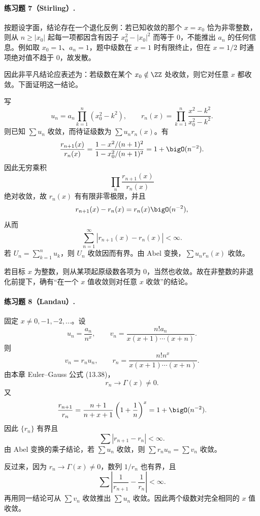 \paragraph{练习题 7（Stirling）.}
\begin{xsolution}
按题设字面，结论存在一个退化反例：若已知收敛的那个 $x=x_0$ 恰为非零整数，则从 $n\geq|x_0|$ 起每一项都因含有因子 $x_0^2-|x_0|^2$ 而等于 $0$，不能推出 $a_n$ 的任何信息。例如取 $x_0=1$、$a_n=1$，题中级数在 $x=1$ 时有限终止，但在 $x=1/2$ 时通项绝对值不趋于 $0$，故发散。

因此非平凡结论应表述为：若级数在某个 $x_0\notin\ZZ$ 处收敛，则它对任意 $x$ 都收敛。下面证明这一结论。

写
\[
 u_n=a_n\prod_{k=1}^{n}(x_0^2-k^2),
 \qquad
 r_n(x)=\prod_{k=1}^{n}\frac{x^2-k^2}{x_0^2-k^2}.
\]
则已知 $\sum u_n$ 收敛，而待证级数为 $\sum u_nr_n(x)$。有
\[
 \frac{r_{n+1}(x)}{r_n(x)}
 =\frac{1-x^2/(n+1)^2}{1-x_0^2/(n+1)^2}
 =1+\bigO(n^{-2}).
\]
因此无穷乘积
\[
 \prod_{n}\frac{r_{n+1}(x)}{r_n(x)}
\]
绝对收敛，故 $r_n(x)$ 有有限非零极限，并且
\[
 r_{n+1}(x)-r_n(x)=r_n(x)\bigO(n^{-2}),
\]
从而
\[
 \sum_{n=1}^{\infty}|r_{n+1}(x)-r_n(x)|<\infty.
\]
若 $U_n=\sum_{k=1}^{n}u_k$，则 $U_n$ 收敛因而有界。由 Abel 变换，$\sum u_nr_n(x)$ 收敛。

若目标 $x$ 为整数，则从某项起原级数各项为 $0$，当然也收敛。故在非整数的非退化前提下，确有“在一个 $x$ 值收敛则对任意 $x$ 收敛”的结论。
\end{xsolution}

\paragraph{练习题 8（Landau）.}
\begin{xsolution}
固定 $x\neq0,-1,-2,\ldots$。设
\[
 u_n=\frac{a_n}{n^x},
 \qquad
 v_n=\frac{n!a_n}{x(x+1)\cdots(x+n)}.
\]
则
\[
 v_n=r_nu_n,
 \qquad
 r_n=\frac{n!n^x}{x(x+1)\cdots(x+n)}.
\]
由本章 Euler--Gauss 公式 (13.38)，
\[
 r_n\longrightarrow\Gamma(x)\neq0.
\]
又
\[
 \frac{r_{n+1}}{r_n}
 =\frac{n+1}{n+x+1}\left(1+\frac1n\right)^x
 =1+\bigO(n^{-2}).
\]
因此 $\{r_n\}$ 有界且
\[
 \sum|r_{n+1}-r_n|<\infty.
\]
由 Abel 变换的乘子结论，若 $\sum u_n$ 收敛，则 $\sum r_nu_n=\sum v_n$ 收敛。

反过来，因为 $r_n\to\Gamma(x)\neq0$，数列 $1/r_n$ 也有界，且
\[
 \sum\left|\frac1{r_{n+1}}-\frac1{r_n}\right|<\infty.
\]
再用同一结论可从 $\sum v_n$ 收敛推出 $\sum u_n$ 收敛。因此两个级数对完全相同的 $x$ 值收敛。
\end{xsolution}

